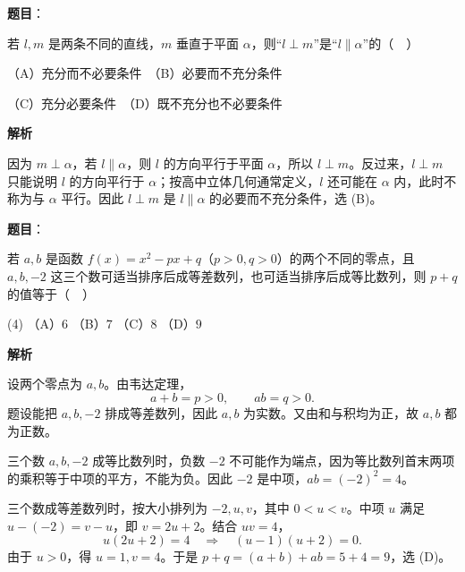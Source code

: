 \begin{answer}

\textbf{题目}：

若 $l,m$ 是两条不同的直线，$m$ 垂直于平面 $\alpha$，则“$l\perp m$”是“$l\parallel\alpha$”的（　）

（A）充分而不必要条件　（B）必要而不充分条件

（C）充分必要条件　（D）既不充分也不必要条件

\textbf{解析}

因为 $m\perp\alpha$，若 $l\parallel\alpha$，则 $l$ 的方向平行于平面 $\alpha$，所以 $l\perp m$。反过来，$l\perp m$ 只能说明 $l$ 的方向平行于 $\alpha$；按高中立体几何通常定义，$l$ 还可能在 $\alpha$ 内，此时不称为与 $\alpha$ 平行。因此 $l\perp m$ 是 $l\parallel\alpha$ 的必要而不充分条件，选 (B)。


\end{answer}
\begin{answer}

\textbf{题目}：

若 $a,b$ 是函数 $f(x)=x^2-px+q$（$p>0,q>0$）的两个不同的零点，且 $a,b,-2$ 这三个数可适当排序后成等差数列，也可适当排序后成等比数列，则 $p+q$ 的值等于（　）

\begin{gkopts}(4)
\task （A）$6$
\task （B）$7$
\task （C）$8$
\task （D）$9$
\end{gkopts}

\textbf{解析}

设两个零点为 $a,b$。由韦达定理，
\nopagebreak[4]
\[
a+b=p>0,\qquad ab=q>0.
\]
题设能把 $a,b,-2$ 排成等差数列，因此 $a,b$ 为实数。又由和与积均为正，故 $a,b$ 都为正数。

三个数 $a,b,-2$ 成等比数列时，负数 $-2$ 不可能作为端点，因为等比数列首末两项的乘积等于中项的平方，不能为负。因此 $-2$ 是中项，$ab=(-2)^2=4$。

三个数成等差数列时，按大小排列为 $-2,u,v$，其中 $0<u<v$。中项 $u$ 满足 $u-(-2)=v-u$，即 $v=2u+2$。结合 $uv=4$，
\nopagebreak[4]
\[
u(2u+2)=4 \quad\Longrightarrow\quad (u-1)(u+2)=0.
\]
由于 $u>0$，得 $u=1,v=4$。于是 $p+q=(a+b)+ab=5+4=9$，选 (D)。


\end{answer}

